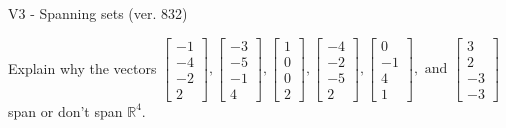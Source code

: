 \begin{exercise}
  \begin{exerciseTitle}V3 - Spanning sets (ver. 832)\end{exerciseTitle}
  \begin{exerciseStatement}
    Explain why the vectors \(\left[\begin{array}{r}
-1 \\
-4 \\
-2 \\
2
\end{array}\right] , \left[\begin{array}{r}
-3 \\
-5 \\
-1 \\
4
\end{array}\right] , \left[\begin{array}{r}
1 \\
0 \\
0 \\
2
\end{array}\right] , \left[\begin{array}{r}
-4 \\
-2 \\
-5 \\
2
\end{array}\right] , \left[\begin{array}{r}
0 \\
-1 \\
4 \\
1
\end{array}\right] , \text{ and } \left[\begin{array}{r}
3 \\
2 \\
-3 \\
-3
\end{array}\right]\) span or don't span \(\mathbb{R}^4\). 
	



\end{exerciseStatement}
\end{exercise}
